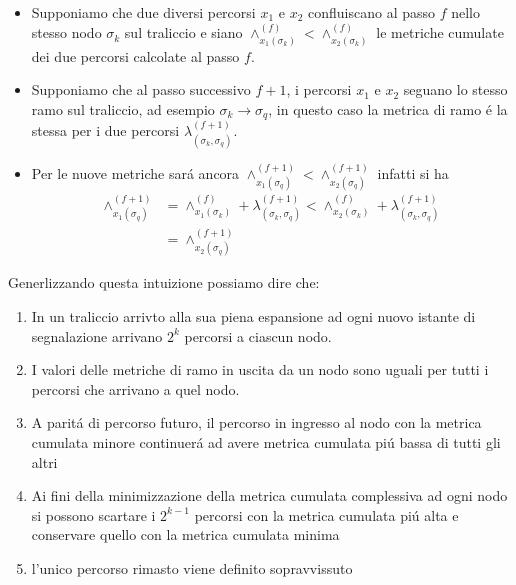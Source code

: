             \begin{itemize}
                \item {Supponiamo che due diversi percorsi $x_1$ e $x_2$ confluiscano al passo $f$ nello stesso nodo $\sigma_k$
                    sul traliccio e siano $\wedge_{x_1 (\sigma_k)}^{(f)}<\wedge_{x_2 (\sigma_k)}^{(f)}$ le metriche cumulate dei due
                    percorsi calcolate al passo $f$.
                }
                \item {Supponiamo che al passo successivo $f+1$, i percorsi $x_1$ e $x_2$ seguano lo stesso
                    ramo sul traliccio, ad esempio $\sigma_k\rightarrow\sigma_q$, in questo caso la metrica di ramo é la stessa per i due 
                    percorsi $\lambda^{(f+1)}_{(\sigma_k,\sigma_q)}$. 
                }
                \item {Per le nuove metriche sará ancora $\wedge_{x_1 (\sigma_q)}^{(f+1)}<\wedge_{x_2 (\sigma_q)}^{(f+1)}$
                    infatti si ha 
                    \begin{align}
                        \wedge_{x_1 (\sigma_q)}^{(f+1)} &= \wedge_{x_1 (\sigma_k)}^{(f)}+\lambda^{(f+1)}_{(\sigma_k,\sigma_q)} < \wedge_{x_2 (\sigma_k)}^{(f)}+\lambda^{(f+1)}_{(\sigma_k,\sigma_q)} \nonumber\\
                                                        &= \wedge_{x_2 (\sigma_q)}^{(f+1)}\nonumber
                    \end{align}
                }
            \end{itemize}
            Generlizzando questa intuizione possiamo dire che:
            \begin{enumerate}
                \item {In un traliccio arrivto alla sua piena espansione ad ogni nuovo istante di segnalazione arrivano $2^k$ percorsi a ciascun nodo.}
                \item {I valori delle metriche di ramo in uscita da un nodo sono uguali per tutti i percorsi che arrivano a quel nodo.}
                \item {A paritá di percorso futuro, il percorso in ingresso al nodo con la metrica cumulata minore continuerá ad avere metrica cumulata piú bassa di tutti gli altri}
                \item {Ai fini della minimizzazione della metrica cumulata complessiva ad ogni nodo si possono scartare i $2^{k-1}$ percorsi con la metrica cumulata 
                    piú alta e conservare quello con la metrica cumulata minima
                }
                \item {l'unico percorso rimasto viene definito sopravvissuto}
            \end{enumerate}
